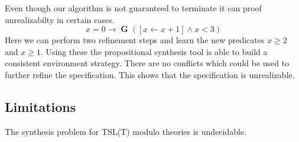 \documentclass[runningheads]{llncs}
\newcommand{\globally}{\operatorname{\mathbf{G}}}
\newcommand{\rarrow}{\boldsymbol{\rightarrow}}
\begin{document}




Even though our algorithm is not guaranteed to terminate it can proof unrealizabilty in certain cases.
$$
x=0 \rarrow \globally ( [x \leftarrow x+1] \land x < 3 )
$$
Here we can perform two refinement steps and learn the new predicates $x \geq 2$ and $x \geq 1$.
Using these the propositional synthesis tool is able to build a consistent environment strategy.
There are no conflicts which could be used to further refine the specification.
This shows that the specification is unrealizable.



\subsection{Limitations}
\label{sec:synth:limitations}
\begin{theorem}
The synthesis problem for TSL(T) modulo theories is undecidable.
\end{theorem}
\end{document}
